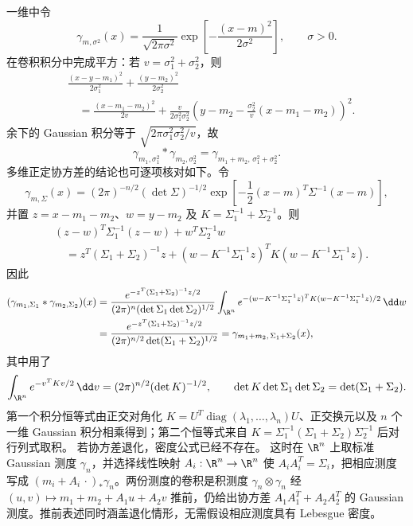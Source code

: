 \begin{example}\label{ex:4-4-1-3}
一维中令
\[
 \gamma_{m,\sigma^2}(x)=\frac1{\sqrt{2\pi\sigma^2}}
 \exp\!\left[-\frac{(x-m)^2}{2\sigma^2}\right],\qquad\sigma>0.
\]
在卷积积分中完成平方：若 $v=\sigma_1^2+\sigma_2^2$，则
\begin{align*}
 &\frac{(x-y-m_1)^2}{2\sigma_1^2}
 +\frac{(y-m_2)^2}{2\sigma_2^2}\\
 &\quad=
 \frac{(x-m_1-m_2)^2}{2v}
 +\frac{v}{2\sigma_1^2\sigma_2^2}
 \left(y-m_2-\frac{\sigma_2^2}{v}(x-m_1-m_2)\right)^2.
\end{align*}
余下的 Gaussian 积分等于
$\sqrt{2\pi\sigma_1^2\sigma_2^2/v}$，故
\[
 \gamma_{m_1,\sigma_1^2}*\gamma_{m_2,\sigma_2^2}
 =\gamma_{m_1+m_2,\,\sigma_1^2+\sigma_2^2}.
\]
多维正定协方差的结论也可逐项核对如下。令
\[
 \gamma_{m,\Sigma}(x)
 =(2\pi)^{-n/2}(\det\Sigma)^{-1/2}
 \exp\!\left[-\frac12(x-m)^T\Sigma^{-1}(x-m)\right],
\]
并置 $z=x-m_1-m_2$、$w=y-m_2$ 及
$K=\Sigma_1^{-1}+\Sigma_2^{-1}$。则
\[
 \begin{aligned}
 &(z-w)^T\Sigma_1^{-1}(z-w)+w^T\Sigma_2^{-1}w\\
 &\quad=z^T(\Sigma_1+\Sigma_2)^{-1}z
 +(w-K^{-1}\Sigma_1^{-1}z)^TK
   (w-K^{-1}\Sigma_1^{-1}z).
 \end{aligned}
\]
因此
\[
 \begin{aligned}
 (\gamma_{m_1,\Sigma_1}*\gamma_{m_2,\Sigma_2})(x)
 &=\frac{e^{-z^T(\Sigma_1+\Sigma_2)^{-1}z/2}}
 {(2\pi)^n(\det\Sigma_1\det\Sigma_2)^{1/2}}
 \int_{\R^n}e^{-(w-K^{-1}\Sigma_1^{-1}z)^TK
 (w-K^{-1}\Sigma_1^{-1}z)/2}\,\dd w\\
 &=\frac{e^{-z^T(\Sigma_1+\Sigma_2)^{-1}z/2}}
 {(2\pi)^{n/2}\det(\Sigma_1+\Sigma_2)^{1/2}}
 =\gamma_{m_1+m_2,\,\Sigma_1+\Sigma_2}(x),
 \end{aligned}
\]
其中用了
\[
 \int_{\R^n}e^{-v^TKv/2}\,\dd v
 =(2\pi)^{n/2}(\det K)^{-1/2},
 \qquad
 \det K\det\Sigma_1\det\Sigma_2=\det(\Sigma_1+\Sigma_2).
\]
第一个积分恒等式由正交对角化
$K=U^T\operatorname{diag}(\lambda_1,\ldots,\lambda_n)U$、正交换元以及 $n$ 个一维
Gaussian 积分相乘得到；第二个恒等式来自
$K=\Sigma_1^{-1}(\Sigma_1+\Sigma_2)\Sigma_2^{-1}$ 后对行列式取积。
若协方差退化，密度公式已经不存在。
这时在 $\R^n$ 上取标准 Gaussian 测度 $\gamma_n$，并选择线性映射
$A_i:\R^n\to\R^n$ 使 $A_iA_i^T=\Sigma_i$，把相应测度写成
$(m_i+A_i\,\cdot)_*\gamma_n$。两份测度的卷积是积测度
$\gamma_n\otimes\gamma_n$ 经
$(u,v)\mapsto m_1+m_2+A_1u+A_2v$ 推前，仍给出协方差
$A_1A_1^T+A_2A_2^T$ 的 Gaussian 测度。推前表述同时涵盖退化情形，无需假设相应测度具有
Lebesgue 密度。
\end{example}

